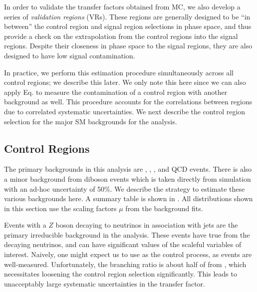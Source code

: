 In order to validate the transfer factors obtained from MC, we also develop a series of \textit{validation regions} (VRs).
These regions are generally designed to be ``in between'' the control region and signal region selections in phase space, and thus provide a check on the extrapolation from the control regions into the signal regions.
Despite their closeness in phase space to the signal regions, they are also designed to have low signal contamination.

In practice, we perform this estimation procedure simultaneously across all control regions; we describe this later.
We only note this here since we can also apply Eq. to measure the contamination of a control region with another background as well.
This procedure accounts for the correlations between regions due to correlated systematic uncertainties.
We next describe the control region selection for the major SM backgrounds for the analysis.


\subsection{Control Regions}

The primary backgrounds in this analysis are \zjets, \wjets, \ttbar, and QCD events.
There is also a minor background from diboson events which is taken directly from simulation with an ad-hoc uncertainty of 50\%.
We describe the strategy to estimate these various backgrounds here.
A summary table is shown in .
All distributions shown in this section use the scaling factors $\mu$ from the background fits.


Events with a $Z$ boson decaying to neutrinos in association with jets are the primary irreducible background in the analysis.
These events have true \met from the decaying neutrinos, and can have significant values of the scaleful variables of interest.
Naively, one might expect us to use \Zll as the control process, as \Zll events are well-measured.
Unfortunately, the \Zll branching ratio is about half of from \Zvv, which necessitates loosening the control region selection significantly.
This leads to unacceptably large systematic uncertainties in the transfer factor.

